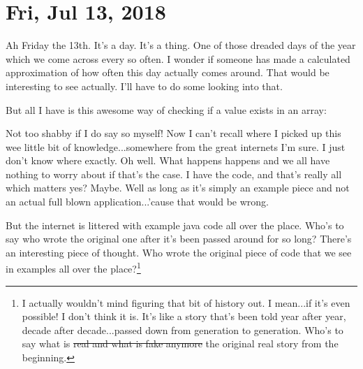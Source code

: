 \section{Fri, Jul 13, 2018}

Ah Friday the 13th. It's a day. It's a thing. One of those dreaded days of the
year which we come across every so often. I wonder if someone has made a
calculated approximation of how often this day actually comes around. That would
be interesting to see actually. I'll have to do some looking into that.

But all I have is this awesome way of checking if a value exists in an array:



Not too shabby if I do say so myself! Now I can't recall where I picked up this
wee little bit of knowledge...somewhere from the great internets I'm sure. I
just don't know where exactly. Oh well. What happens happens and we all have
nothing to worry about if that's the case. I have the code, and that's really
all which matters yes? Maybe. Well as long as it's simply an example piece and
not an actual full blown application...'cause that would be wrong.

But the internet is littered with example java code all over the place. Who's to
say who wrote the original one after it's been passed around for so long?
There's an interesting piece of thought. Who wrote the original piece of code
that we see in examples all over the place?\footnote{
I actually wouldn't mind figuring that bit of history out. I mean...if it's even
possible! I don't think it is. It's like a story that's been told year after
year, decade after decade...passed down from generation to generation. Who's to
say what is \st{real and what is fake anymore} the original real story from the 
beginning.
}